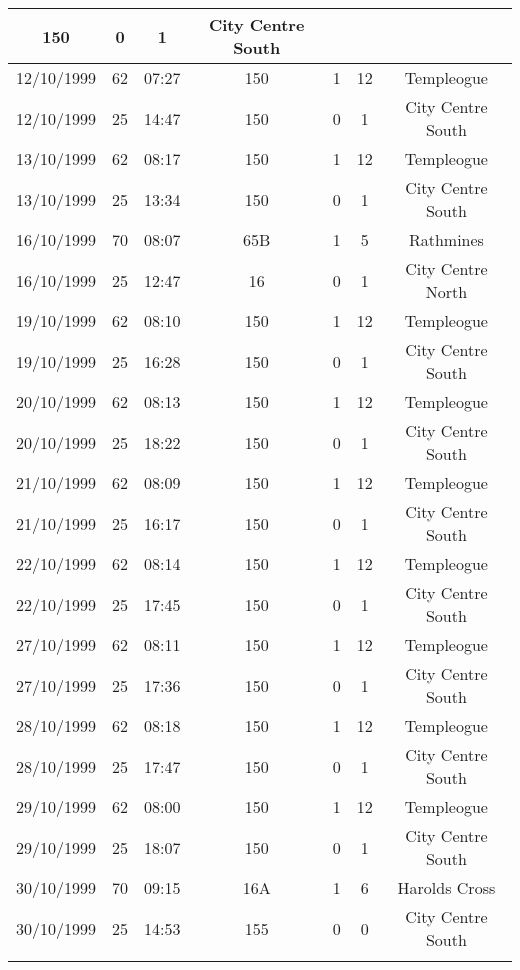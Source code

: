 \begin{longtable}[htbp] {ccccccc}
150   & 0& 1&
City Centre South \\
\hline 12/10/1999& 62& 07:27&

150   & 1& 12&
Templeogue \\
\hline 12/10/1999& 25& 14:47&

150   & 0& 1&
City Centre South \\
\hline 13/10/1999& 62& 08:17&

150   & 1& 12&
Templeogue \\
\hline 13/10/1999& 25& 13:34&

150   & 0& 1&
City Centre South \\
\hline 16/10/1999& 70& 08:07&

65B   & 1& 5&
Rathmines \\
\hline 16/10/1999& 25& 12:47&

16   & 0& 1&
City Centre North \\
\hline 19/10/1999& 62& 08:10&

150   & 1& 12&
Templeogue \\
\hline 19/10/1999& 25& 16:28&

150   & 0& 1&
City Centre South \\
\hline 20/10/1999& 62& 08:13&

150   & 1& 12&
Templeogue \\
\hline 20/10/1999& 25& 18:22&

150   & 0& 1&
City Centre South \\
\hline 21/10/1999& 62& 08:09&

150   & 1& 12&
Templeogue \\
\hline 21/10/1999& 25& 16:17&

150   & 0& 1&
City Centre South \\
\hline 22/10/1999& 62& 08:14&

150   & 1& 12&
Templeogue \\
\hline 22/10/1999& 25& 17:45&

150   & 0& 1&
City Centre South \\
\hline 27/10/1999& 62& 08:11&

150   & 1& 12&
Templeogue \\
\hline 27/10/1999& 25& 17:36&

150   & 0& 1&
City Centre South \\
\hline 28/10/1999& 62& 08:18&

150   & 1& 12&
Templeogue \\
\hline 28/10/1999& 25& 17:47&

150   & 0& 1&
City Centre South \\
\hline 29/10/1999& 62& 08:00&

150   & 1& 12&
Templeogue \\
\hline 29/10/1999& 25& 18:07&

150   & 0& 1&
City Centre South \\
\hline 30/10/1999& 70& 09:15&

16A   & 1& 6&
Harolds Cross \\
\hline 30/10/1999& 25& 14:53&

155   & 0& 0& City Centre South \\ \hline \label{tab14}
\end{longtable}

